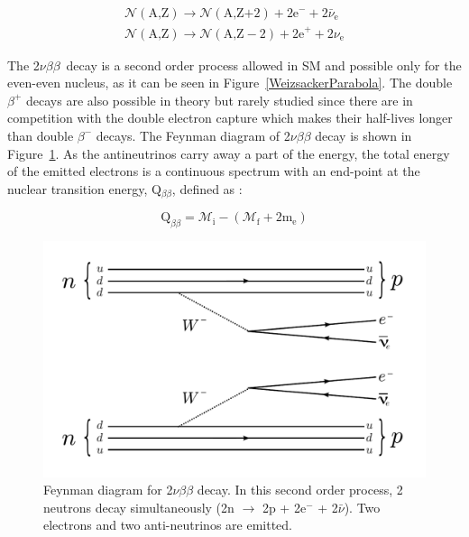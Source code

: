 \documentclass[main.tex]{subfiles}
\begin{document}
\begin{equation}
\begin{split}
\mathcal{N} (\text{A,Z}) \rightarrow \mathcal{N} (\text{A,Z+2}) + \text{2e}^- + \text{2}\bar{\nu}_{\text{e}}  \\[0.1cm]
\mathcal{N} (\text{A,Z}) \rightarrow \mathcal{N} (\text{A,Z}-\text{2}) + \text{2e}^+ + \text{2}\nu_{\text{e}} 
\end{split}
\end{equation}


\NI The 2$\nu\beta\beta$~decay is a second order process allowed in SM and possible only for the even-even nucleus, as it can be seen in Figure~\ref{WeizsackerParabola}. The double $\beta^{+}$ decays are also possible in theory but rarely studied since there are in competition with the double electron capture which makes their half-lives longer than double $\beta^{-}$ decays. The Feynman diagram of 2$\nu\beta\beta$ decay is shown in Figure~\ref{2nubbFeynman}. As the antineutrinos carry away a part of the energy, the total energy of the emitted electrons is a continuous spectrum with an end-point at the nuclear transition energy, Q$_{\beta\beta}$, defined as :


\begin{equation}
\text{Q}_{\beta\beta} = \mathcal{M}_\text{i} - (\mathcal{M}_\text{f} + \text{2m}_\text{e})
\end{equation}


\begin{figure}[h!]
\begin{center}
\includegraphics[scale=0.45]{pictures/Chap2/2nubbFeynmanDiagram_v3.pdf}
\caption{Feynman diagram for 2$\nu\beta\beta$ decay. In this second order process, 2 neutrons decay simultaneously (2n $\rightarrow$ 2p + 2e$^-$ + 2$\bar{\nu}$). Two electrons and two anti-neutrinos are emitted.}
\label{2nubbFeynman}
\end{center}
\end{figure}
\end{document}

